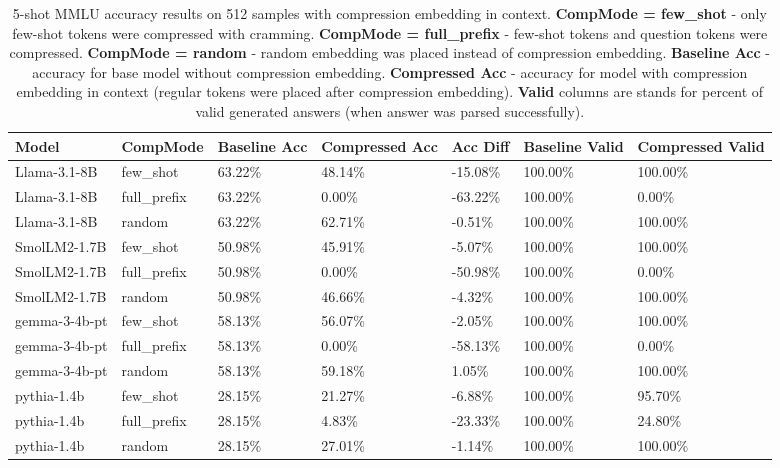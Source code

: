 \begin{table}[]
    \centering
    \caption{5-shot MMLU accuracy results on 512 samples with compression embedding in context. \textbf{CompMode = few\_shot} - only few-shot tokens were compressed with cramming. \textbf{CompMode = full\_prefix} - few-shot tokens and question tokens were compressed. \textbf{CompMode = random} - random embedding was placed instead of compression embedding. \textbf{Baseline Acc} - accuracy for base model without compression embedding. \textbf{Compressed Acc} - accuracy for model with compression embedding in context (regular tokens were placed after compression embedding). \textbf{Valid} columns are stands for percent of valid generated answers (when answer was parsed successfully).}
    \label{tab:rebuttle_mmlu}

\begin{tabular}{lllllll}
\hline
 Model         & CompMode    & Baseline Acc   & Compressed Acc   & Acc Diff   & Baseline Valid   & Compressed Valid   \\
\hline
 Llama-3.1-8B  & few\_shot    & 63.22\%         & 48.14\%           & -15.08\%    & 100.00\%          & 100.00\%            \\
 Llama-3.1-8B  & full\_prefix & 63.22\%         & 0.00\%            & -63.22\%    & 100.00\%          & 0.00\%              \\
 Llama-3.1-8B  & random      & 63.22\%         & 62.71\%           & -0.51\%     & 100.00\%          & 100.00\%            \\
 \midrule
 SmolLM2-1.7B  & few\_shot    & 50.98\%         & 45.91\%           & -5.07\%     & 100.00\%          & 100.00\%            \\
 SmolLM2-1.7B  & full\_prefix & 50.98\%         & 0.00\%            & -50.98\%    & 100.00\%          & 0.00\%              \\
 SmolLM2-1.7B  & random      & 50.98\%         & 46.66\%           & -4.32\%     & 100.00\%          & 100.00\%            \\
 \midrule
 gemma-3-4b-pt & few\_shot    & 58.13\%         & 56.07\%           & -2.05\%     & 100.00\%          & 100.00\%            \\
 gemma-3-4b-pt & full\_prefix & 58.13\%         & 0.00\%            & -58.13\%    & 100.00\%          & 0.00\%              \\
 gemma-3-4b-pt & random      & 58.13\%         & 59.18\%           & 1.05\%      & 100.00\%          & 100.00\%            \\
\midrule
 pythia-1.4b   & few\_shot    & 28.15\%         & 21.27\%           & -6.88\%     & 100.00\%          & 95.70\%             \\
 pythia-1.4b   & full\_prefix & 28.15\%         & 4.83\%            & -23.33\%    & 100.00\%          & 24.80\%             \\
 pythia-1.4b   & random      & 28.15\%         & 27.01\%           & -1.14\%     & 100.00\%          & 100.00\%            \\
\hline
\end{tabular}

\end{table}


